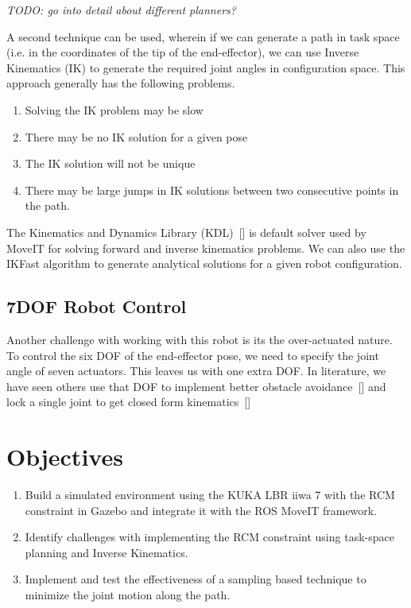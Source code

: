 \documentclass[BTech]{iitmdiss}
\begin{document}
    \emph{TODO: go into detail about different planners?}

    A second technique can be used, wherein if we can generate a path in task space (i.e. in the coordinates of the tip of the end-effector),
    we can use Inverse Kinematics (IK) to generate the required joint angles in configuration space. This approach generally has the following problems.
    \begin{enumerate}
        \item Solving the IK problem may be slow
        \item There may be no IK solution for a given pose
        \item The IK solution will not be unique
        \item There may be large jumps in IK solutions between two consecutive points in the path.
    \end{enumerate}

    The Kinematics and Dynamics Library (KDL)~[\cite{kdl-url}] is default solver used by MoveIT for solving forward and inverse kinematics problems.
    We can also use the IKFast algorithm to generate analytical solutions for a given robot configuration.

    \subsection{7DOF Robot Control}

    Another challenge with working with this robot is its the over-actuated nature.
    To control the six DOF of the end-effector pose, we need to specify the joint angle of seven actuators.
    This leaves us with one extra DOF.
    In literature, we have seen others use that DOF to implement better obstacle avoidance~[\cite{Doliwa_2020}] and lock a single joint to get closed form kinematics~[\cite{Asthana}]


    \section{Objectives}

    \begin{enumerate}
        \item Build a simulated environment using the KUKA LBR iiwa 7 with the RCM constraint in Gazebo and integrate it with the ROS MoveIT framework.
        \item Identify challenges with implementing the RCM constraint using task-space planning and Inverse Kinematics.
        \item Implement and test the effectiveness of a sampling based technique to minimize the joint motion along the path.
    \end{enumerate}
\end{document}
